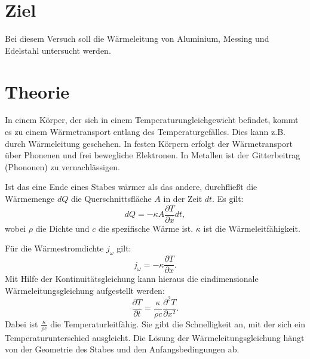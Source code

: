 \section{Ziel}
\label{sec:Ziel}

Bei diesem Versuch soll die Wärmeleitung von Aluminium, Messing und Edelstahl untersucht werden. 

\section{Theorie}
\label{sec:Theorie}

In einem Körper, der sich in einem Temperaturungleichgewicht befindet, kommt es zu einem Wärmetransport entlang 
des Temperaturgefälles. Dies kann z.B. durch Wärmeleitung geschehen. In festen Körpern erfolgt der Wärmetransport 
über Phonenen und frei bewegliche Elektronen. In Metallen ist der Gitterbeitrag (Phononen) zu vernachlässigen. 

\noindent Ist das eine Ende eines Stabes wärmer als das andere, durchfließt die Wärmemenge $dQ$ die Querschnittsfläche $A$ in der Zeit $dt$. Es gilt:
\begin{equation}
dQ = -\kappa A \frac{\partial T}{\partial x} dt,
\label{eq:dQ}
\end{equation}
wobei $\rho$ die Dichte und $c$ die spezifische Wärme ist.
$\kappa$ ist die Wärmeleitfähigkeit.

\noindent Für die Wärmestromdichte $j_{\omega}$ gilt:
\begin{equation}
    j_{\omega} = -\kappa \frac{\partial T}{\partial x}.
    \label{eq:jomega}
\end{equation}
Mit Hilfe der Kontinuitätsgleichung kann hieraus die eindimensionale Wärmeleitungsgleichung aufgestellt werden:
\begin{equation}
    \frac{\partial T}{\partial t} = \frac{\kappa}{\rho c} \frac{\partial^2 T}{\partial x^2}.
    \label{eq:warmeleitung}
\end{equation}
Dabei ist $\frac{\kappa}{\rho c}$ die Temperaturleitfähig. Sie gibt die Schnelligkeit an, mit der sich ein 
Temperaturunterschied ausgleicht. Die Lösung der Wärmeleitungsgleichung hängt von der Geometrie des Stabes und den Anfangsbedingungen ab. 


